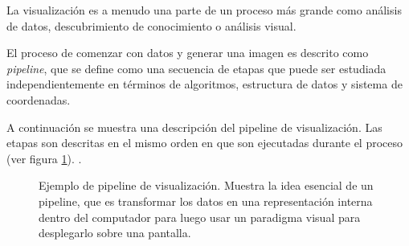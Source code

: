 \documentclass[12pt]{article}
\begin{document}
La visualización es a menudo una parte de un proceso más grande como análisis de datos, descubrimiento de conocimiento o análisis visual.

El proceso de comenzar con datos y generar una imagen es descrito como \textit{pipeline}, que se define como una secuencia de etapas que puede ser estudiada independientemente en términos de algoritmos, estructura de datos y sistema de coordenadas. %

A continuación se muestra una descripción del pipeline de visualización. Las etapas son descritas en el mismo orden en que son ejecutadas durante el proceso (ver figura \ref{fig:pipeline_visualizacion}).
.




\begin{figure}[h] %
\caption[Pipeline de visualización]{Ejemplo de pipeline de visualización. Muestra la idea esencial de un pipeline, que es transformar los datos en una representación interna dentro del computador para luego usar un paradigma visual para desplegarlo sobre una pantalla.}
\label{fig:pipeline_visualizacion}
\end{figure}
\end{document}
